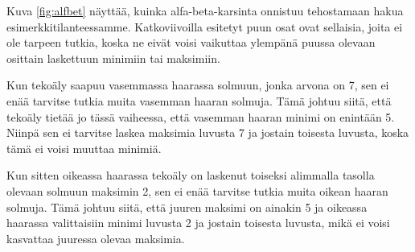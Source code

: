 Kuva \ref{fig:alfbet} näyttää, kuinka alfa-beta-karsinta
onnistuu tehostamaan hakua esimerkkitilanteessamme.
Katkoviivoilla esitetyt puun osat ovat sellaisia,
joita ei ole tarpeen tutkia, koska ne eivät voisi vaikuttaa
ylempänä puussa olevaan osittain laskettuun minimiin tai maksimiin.

Kun tekoäly saapuu vasemmassa haarassa solmuun,
jonka arvona on 7, sen ei enää tarvitse tutkia muita
vasemman haaran solmuja. Tämä johtuu siitä, että tekoäly
tietää jo tässä vaiheessa, että vasemman haaran minimi
on enintään 5. Niinpä sen ei tarvitse laskea maksimia luvusta
7 ja jostain toisesta luvusta, koska tämä ei voisi muuttaa minimiä.

Kun sitten oikeassa haarassa tekoäly on laskenut
toiseksi alimmalla tasolla olevaan solmuun
maksimin 2, sen ei enää tarvitse tutkia muita oikean haaran solmuja.
Tämä johtuu siitä, että juuren maksimi on ainakin 5 ja
oikeassa haarassa valittaisiin minimi luvusta 2 ja jostain toisesta luvusta,
mikä ei voisi kasvattaa juuressa olevaa maksimia.
